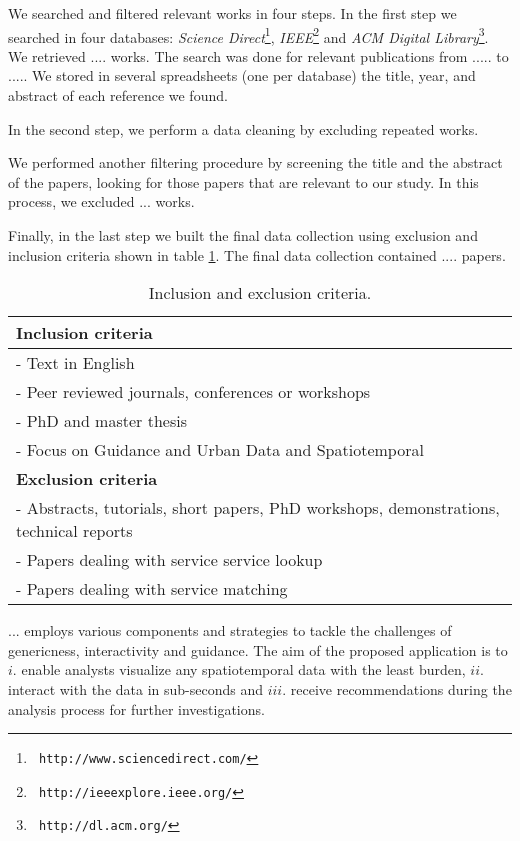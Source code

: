 \documentclass[runningheads,a4paper]{llncs}
\begin{document}
 
We searched and filtered relevant works in four steps. 
In the first  step we
searched in four databases: \textit{Science Direct}\footnote{\tt
http://www.sciencedirect.com/}, \textit{IEEE}\footnote{\tt
http://ieeexplore.ieee.org/} and \textit{ACM Digital Library}\footnote{\tt
http://dl.acm.org/}. %
We retrieved .... works. 
The search was done for relevant publications from ..... to ..... 
We stored in several spreadsheets (one per database) the title, year,  and abstract of each reference we found. 

In the second step, we perform a data cleaning by excluding repeated works.  

We performed another filtering procedure by screening the title and the abstract
of the papers, looking for those papers that are relevant to our study.
In this process, we excluded ... works. 
 
Finally, in the last step we built the final data collection using exclusion
and inclusion criteria shown in table \ref{table:criteria}. The final data
collection contained .... papers.

\begin{table}\centering \small
\begin{tabular}{|l|} \hline
\textbf{Inclusion criteria}		\\ \hline\hline
- Text in English								\\ \hline
- Peer reviewed journals, conferences or workshops	\\ \hline
- PhD and master thesis	\\ \hline
- Focus on Guidance and Urban Data and Spatiotemporal				\\ \hline\hline
\textbf{Exclusion criteria}		\\ \hline\hline
- Abstracts, tutorials, short papers, PhD workshops, demonstrations, technical reports		\\ \hline
- Papers dealing with service service lookup		\\ \hline
- Papers dealing with service matching 	\\ \hline
\end{tabular}
\caption{\label{table:criteria} Inclusion and exclusion criteria.}
\end{table}

... employs various components and strategies to tackle the challenges of genericness, interactivity and guidance. The aim of the proposed application is to $i.$ enable analysts visualize any spatiotemporal data with the least burden, $ii.$ interact with the data in sub-seconds and $iii.$ receive recommendations during the analysis process for further investigations.
\end{document}
